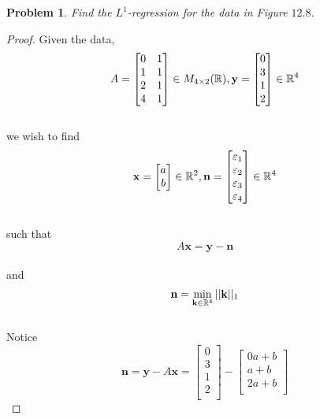 \documentclass[12pt,oneside]{amsart}
\numberwithin{equation}{section}
\numberwithin{figure}{section}
\theoremstyle{plain}
\newtheorem{prob}{Problem}
\theoremstyle{definition}
\newcommand{\R}{\ensuremath \mathbb{R}}
\begin{document}
\begin{prob}
Find the $L^1$-regression for the data in Figure $12.8$. \\
\end{prob}
\begin{proof}
Given the data, \\
\[A = \begin{bmatrix}
  0 & 1 \\
  1 & 1 \\
  2 & 1 \\
  4 & 1 \\
\end{bmatrix} \in M_{4 \times 2}(\R), \mathbf{y} = \begin{bmatrix}
  0 \\
  3 \\
  1 \\
  2 \\
\end{bmatrix} \in \R^4\] \\ 
we wish to find \\
\[\mathbf{x} = \begin{bmatrix} 
  a \\
  b \\
\end{bmatrix} \in \R^2,\mathbf{n} = \begin{bmatrix}
  \varepsilon_1 \\
  \varepsilon_2 \\
  \varepsilon_3 \\
  \varepsilon_4 \\
\end{bmatrix} \in \R^4\] \\
such that \\
\[A\mathbf{x} = \mathbf{y} - \mathbf{n}\] \\
and \\
\[\mathbf{n} = \min_{\mathbf{k} \in \R^4}||\mathbf{k}||_1\] \\
Notice \\
\[\mathbf{n} = \mathbf{y} - A\mathbf{x} = \begin{bmatrix}
0 \\
3 \\
1 \\
2 \\
\end{bmatrix} - \begin{bmatrix}
0a + b \\
a + b \\
2a + b \\

\end{bmatrix}\]
\end{proof}
\end{document}
